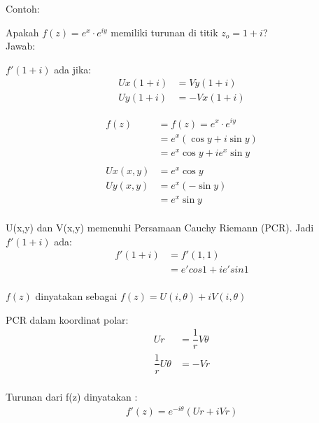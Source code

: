 \documentclass{article}
\begin{document}
\newpage
Contoh:

Apakah $f(z)=e^x \cdot e^{iy}$ memiliki turunan di titik $z_o = 1+i$?\\

Jawab:

$f'(1+i)$ ada jika:
\begin{align}
    Ux(1+i) & = Vy(1+i)
    \nonumber            \\
    Uy(1+i) & = -Vx(1+i)
    \nonumber
\end{align}

\begin{align}
    f(z)    & = f(z)=e^x \cdot e^{iy}
    \nonumber                             \\
            & = e^x(\cos y + i \sin y)
    \nonumber                             \\
            & = e^x \cos y + i e^x \sin y
    \nonumber                             \\
    \nonumber                             \\
    Ux(x,y) & = e^x \cos y
    \nonumber                             \\
    Uy(x,y) & = e^x (-\sin y)
    \nonumber                             \\
            & = e^x \sin y
    \nonumber                             \\
    \nonumber
\end{align}

U(x,y) dan V(x,y) memenuhi Persamaan Cauchy Riemann (PCR). Jadi $f'(1+i)$ ada:
\begin{align}
    f'(1+i) & = f'(1,1)
    \nonumber                       \\
            & = e'cos 1 + i e'sin 1
    \nonumber                       \\
    \nonumber
\end{align}


$f(z)$ dinyatakan sebagai $f(z) = U(i,\theta)+ iV(i,\theta)$

PCR dalam koordinat polar:
\begin{align}
    Ur                  & = \dfrac{1}{r}V\theta
    \nonumber                                   \\
    \dfrac{1}{r}U\theta & = -Vr
    \nonumber                                   \\
    \nonumber
\end{align}

Turunan dari f(z) dinyatakan :
\begin{align}
    f'(z) = e^{-i\theta}(Ur+iVr)
    \nonumber
\end{align}
\end{document}
